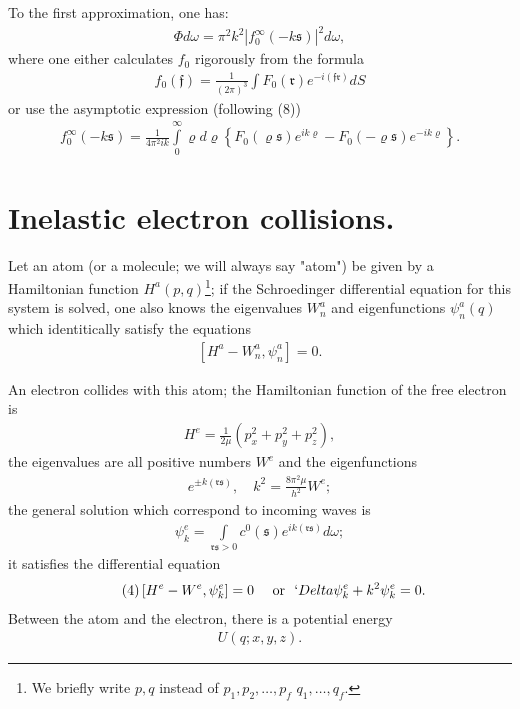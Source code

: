 \documentclass[a4paper,11pt]{article}
\newcommand{\?}[2]{#1\footnote{\textsc{Translator note}: #2}}
\newcommand{\nequ}[2]{\begin{align*}\tag{#1}#2\end{align*}}
\newcommand{\uequ}[1]{\begin{align*}#1\end{align*}}
\renewcommand{\exp}[1]{e^{#1}}
\begin{document}
To the first approximation, one has:
\nequ{11}{
\Phi d\omega = \pi^2 k^2 \left| f_0^\infty (-k\mathfrak{s})\right|^2 d\omega,
}
where one either calculates $f_0$ rigorously from the formula
\nequ{12}{
f_0(\mathfrak{f}) = \frac{1}{(2\pi)^3}\int F_0(\mathfrak{r})\exp{-i(\mathfrak{fr})}dS
}
or use the asymptotic expression (following (8))
\nequ{13}{
f_0^\infty(-k\mathfrak{s}) = \frac{1}{4\pi^2 ik}
\int\limits_0^\infty \varrho d\varrho \left\{F_0(\varrho\mathfrak{s})\exp{ik\varrho} - 
F_0(-\varrho\mathfrak{s})\exp{-ik\varrho}
\right\}.
}

\section{Inelastic electron collisions.} Let an atom (or a molecule; we will always say "atom") be given by a Hamiltonian function $H^a(p,q)$\footnote{We briefly write $p,q$ instead of $p_1,p_2,\dots,p_f$ $q_1, \dots, q_f$.}; if the Schroedinger differential equation for this system is solved, one also knows the eigenvalues $W^a_n$ and eigenfunctions $\psi^a_n(q)$ which identitically satisfy the equations
\nequ{1}{
\left[H^a - W_n^a, \psi_n^a \right] = 0.
}

An electron collides with this atom; the Hamiltonian function of the free electron is
\uequ{
H^e = \frac{1}{2\mu}(p_x^2 + p_y^2 + p_z^2),
}
the eigenvalues are all positive numbers $W^e$ and the eigenfunctions
\nequ{2}{
\exp{\pm k(\mathfrak{rs})}, \quad k^2 = \frac{8\pi^2\mu}{h^2} W^e;
}
the general solution which correspond to incoming waves is
\nequ{3}{
\psi_k^e = \int\limits_{\mathfrak{rs}>0}c^0(\mathfrak{s})\exp{ik(\mathfrak{rs})}d\omega;
}
it satisfies the differential equation
\nequ{4}{
\left[H^e - W^e, \psi_k^e\right] = 0 \quad 
\text{ or } \
`Delta\psi_k^e + k^2\psi_k^e = 0.
}
Between the atom and the electron, there is a potential energy
\nequ{5}{
U(q; x,y,z).
}
\end{document}
